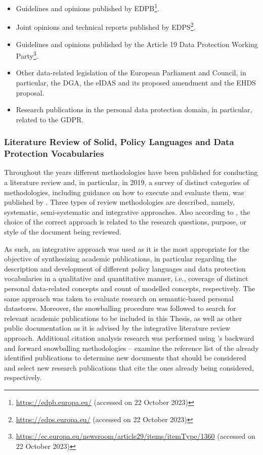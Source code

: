 \begin{itemize}
    \item Guidelines and opinions published by EDPB\footnote{\url{https://edpb.europa.eu/} (accessed on 22 October 2023)}.
    \item Joint opinions and technical reports published by EDPS\footnote{\url{https://edps.europa.eu/} (accessed on 22 October 2023)}.
    \item Guidelines and opinions published by the Article 19 Data Protection Working Party\footnote{\url{https://ec.europa.eu/newsroom/article29/items/itemType/1360} (accessed on 22 October 2023)}.
    \item Other data-related legislation of the European Parliament and Council, in particular, the DGA, the eIDAS and its proposed amendment and the EHDS proposal.
    \item Research publications in the personal data protection domain, in particular, related to the GDPR.
\end{itemize}

\subsubsection{Literature Review of Solid, Policy Languages and Data Protection Vocabularies}
\label{sec:technical_review}

Throughout the years different methodologies have been published for conducting a literature review \citep{webster_analyzing_2002, kitchenham_systematic_2013} and, in particular, in 2019, a survey of distinct categories of methodologies, including guidance on how to execute and evaluate them, was published by \cite{snyder_literature_2019}.
Three types of review methodologies are described, namely, systematic, semi-systematic and integrative approaches. %
Also according to \citeauthor{snyder_literature_2019}, the choice of the correct approach is related to the research questions, purpose, or style of the document being reviewed.

As such, an integrative approach \citep{whittemore_integrative_2005} was used as it is the most appropriate for the objective of synthesizing academic publications, in particular regarding the description and development of different policy languages and data protection vocabularies in a qualitative and quantitative manner, i.e., coverage of distinct personal data-related concepts and count of modelled concepts, respectively.
The same approach was taken to evaluate research on semantic-based personal datastores.
Moreover, the snowballing procedure \citep{wohlin_guidelines_2014} was followed to search for relevant academic publications to be included in this Thesis, as well as other public documentation as it is advised by the integrative literature review approach.
Additional citation analysis research was performed using \citeauthor{webster_analyzing_2002}'s backward and forward snowballing methodologies -- examine the reference list of the already identified publications to determine new documents that should be considered and select new research publications that cite the ones already being considered, respectively.

